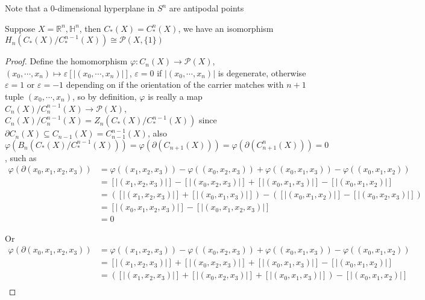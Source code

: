\documentclass[../main.tex]{subfiles}
\begin{document}
\begin{remark}
Note that a $0$-dimensional hyperplane in $S^n$ are antipodal points
\end{remark}

\begin{theorem}
Suppose $X=\mathbb R^n,\mathbb H^n$, then $C_*(X)=C_*^n(X)$, we have an isomorphism $H_n(C_*(X)/C_*^{n-1}(X))\cong\mathcal P(X,\{1\})$
\end{theorem}

\begin{proof}
Define the homomorphism $\varphi:C_n(X)\to\mathcal P(X)$, $(x_0,\cdots,x_n)\mapsto\varepsilon[|(x_0,\cdots,x_n)|]$, $\varepsilon=0$ if $|(x_0,\cdots,x_n)|$ is degenerate, otherwise $\varepsilon=1$ or $\varepsilon=-1$ depending on if the orientation of the carrier matches with $n+1$ tuple $(x_0,\cdots,x_n)$, so by definition, $\varphi$ is really a map $C_n(X)/C^{n-1}_n(X)\to\mathcal P(X)$, $C_n(X)/C^{n-1}_n(X)=Z_n(C_*(X)/C^{n-1}_*(X))$ since $\partial C_n(X)\subseteq C_{n-1}(X)=C_{n-1}^{n-1}(X)$, also 
$\varphi(B_n(C_*(X)/C^{n-1}_*(X)))=\varphi(\partial(C_{n+1}(X)))=\varphi(\partial(C^n_{n+1}(X)))=0$, such as
\begin{align*}
\varphi(\partial(x_0,x_1,x_2,x_3))&=\varphi((x_1,x_2,x_3))-\varphi((x_0,x_2,x_3))+\varphi((x_0,x_1,x_3))-\varphi((x_0,x_1,x_2)) \\
&=[|(x_1,x_2,x_3)|]-[|(x_0,x_2,x_3)|]+[|(x_0,x_1,x_3)|]-[|(x_0,x_1,x_2)|] \\
&=([|(x_1,x_2,x_3)|]+[|(x_0,x_1,x_3)|])-([|(x_0,x_1,x_2)|]-[|(x_0,x_2,x_3)|]) \\
&=[|(x_0,x_1,x_2,x_3)|]-[|(x_0,x_1,x_2,x_3)|] \\
&=0
\end{align*}
\begin{center}
\end{center}
Or
\begin{align*}
\varphi(\partial(x_0,x_1,x_2,x_3))&=\varphi((x_1,x_2,x_3))-\varphi((x_0,x_2,x_3))+\varphi((x_0,x_1,x_3))-\varphi((x_0,x_1,x_2)) \\
&=[|(x_1,x_2,x_3)|]+[|(x_0,x_2,x_3)|]+[|(x_0,x_1,x_3)|]-[|(x_0,x_1,x_2)|] \\
&=([|(x_1,x_2,x_3)|]+[|(x_0,x_2,x_3)|]+[|(x_0,x_1,x_3)|])-[|(x_0,x_1,x_2)|] \\

\end{align*}
\end{proof}
\end{document}
